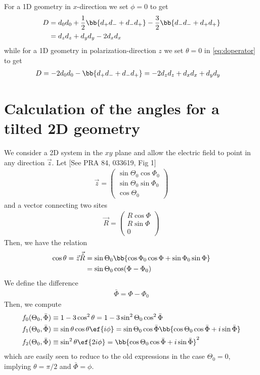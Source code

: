 For a 1D geometry in $x$-direction we set $\phi=0$ to get
\begin{align*}
D &= d_0 d_0 + \frac{1}{2}\bb{d_+ d_- + d_- d_+} -\frac{3}{2} \bb{d_- d_- + d_+ d_+}\\
 &= d_z d_z + d_y d_y - 2 d_x d_x
\end{align*}
while for a 1D geometry in polarization-direction $z$ we set $\theta=0$ in \eqref{eq:doperator} to get
\begin{align*}
D &= -2 d_0 d_0 - \bb{d_+ d_- + d_- d_+} = -2 d_z d_z+ d_x d_x + d_y d_y
\end{align*}

\section{Calculation of the angles for a tilted 2D geometry}
We consider a 2D system in the $xy$ plane and allow the electric field to point in any direction $\vec{z}$. Let [See PRA 84, 033619, Fig 1]
\begin{align}
\vec{z}=\begin{pmatrix}
\sin\Theta_0\cos\Phi_0 \\
\sin\Theta_0\sin\Phi_0 \\
\cos\Theta_0
\end{pmatrix}
\end{align}
and a vector connecting two sites
\begin{align}
\vec{R}=\begin{pmatrix}R\cos\Phi \\ R\sin\Phi \\ 0\end{pmatrix}
\end{align}
Then, we have the relation
\begin{align}
\cos\theta = \vec{z}\vec{\hat{R}} &= \sin\Theta_0\bb{\cos\Phi_0\cos\Phi+\sin\Phi_0\sin\Phi}\\
&=\sin\Theta_0\cos(\Phi-\Phi_0)
\end{align}
We define the difference
\begin{align}
\bar\Phi=\Phi-\Phi_0
\end{align}
Then, we compute
\begin{align}
    f_0(\Theta_0, \bar \Phi)&\equiv 1-3\cos^2\theta = 1-3\sin^2\Theta_0\cos^2\bar\Phi  \\
    f_1(\Theta_0, \bar \Phi)&\equiv \sin\theta\cos\theta \ef{i\phi} = \sin\Theta_0 \cos\bar\Phi \bb{\cos\Theta_0 \cos\bar\Phi + i \sin \bar\Phi}\\
    f_2(\Theta_0, \bar \Phi)&\equiv\sin^2\theta \ef{2i\phi} = \bb{\cos\Theta_0 \cos\bar\Phi + i \sin \bar\Phi}^2
\end{align}
which are easily seen to reduce to the old expressions in the case $\Theta_0=0$,
implying $\theta=\pi/2$ and $\bar\Phi=\phi$.

